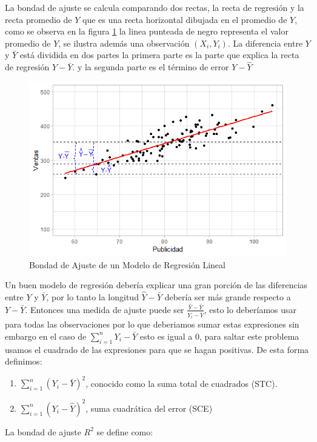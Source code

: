 \documentclass[]{book}
\providecommand{\tightlist}{%
  \setlength{\itemsep}{0pt}\setlength{\parskip}{0pt}}
\begin{document}
La bondad de ajuste se calcula comparando dos rectas, la recta de regresión y la recta promedio de \(Y\) que es una recta horizontal dibujada en el promedio de \(Y\), como se observa en la figura \ref{fig:determinacion} la linea punteada de negro representa el valor promedio de \(Y\), se ilustra además una observación \(\left(X_i,Y_i\right)\). La diferencia entre \(Y\) y \(\bar{Y}\) está dividida en dos partes la primera parte es la parte que explica la recta de regresión \(\hat{Y}-\bar{Y}\). y la segunda parte es el término de error \(Y-\hat{Y}\)

\begin{figure}[h]

{\centering \includegraphics[width=0.5\linewidth]{error5} 

}

\caption{Bondad de Ajuste de un Modelo de Regresión Lineal}\label{fig:determinacion}
\end{figure}

Un buen modelo de regresión debería explicar una gran porción de las diferencias entre \(Y\) y \(\bar{Y}\), por lo tanto la longitud \(\hat{Y}-\bar{Y}\) debería ser más grande respecto a \(Y-\bar{Y}\). Entonces una medida de ajuste puede ser \(\frac{\hat{Y}-\bar{Y}}{Y_i-\bar{Y}}\), esto lo deberíamos usar para todas las observaciones por lo que deberiamos sumar estas expresiones sin embargo en el caso de \(\sum_{i=1}^{n}{Y_i-\bar{Y}}\) esto es igual a \(0\), para saltar este problema usamos el cuadrado de las expresiones para que se hagan positivas. De esta forma definimos:

\begin{enumerate}
\def\labelenumi{\arabic{enumi}.}
\tightlist
\item
  \(\sum_{i=1}^{n}{\left(Y_i-\bar{Y}\right)^2}\), conocido como la suma total de cuadrados (STC).
\item
  \(\sum_{i=1}^{n}{\left(Y_i-\hat{Y}\right)^2}\), suma cuadrática del error (SCE)
\end{enumerate}

La bondad de ajuste \(R^2\) se define como:
\end{document}
